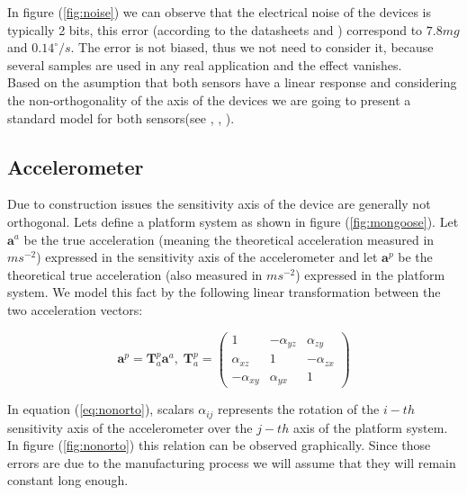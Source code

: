 \documentclass[conference]{IEEEtran}
\newcommand{\refp}[1]{(\ref{#1})}
\begin{document}
In figure \refp{fig:noise} we can observe that the electrical noise of the devices is typically 2 bits, this error (according to the datasheets \cite{bib:acc_data} and \cite{bib:gyro_data}) correspond to $7.8 mg$ and $0.14 ^{\circ}/s $. The error is not biased, thus we not need to consider it, because several samples are used in any real application and the effect vanishes.\\

Based on the asumption that both sensors have a linear response and considering the non-orthogonality of the axis of the devices we are going to present a standard model for both sensors(see \cite{bib:calib_imu}, \cite{bib:kalman}, \cite{bib:calib_imu_dos}).

\subsection{Accelerometer}
Due to construction issues the sensitivity axis of the device are generally not orthogonal. Lets define a platform system as shown in figure \refp{fig:mongoose}. Let $\mathbf{a}^a$ be the true acceleration (meaning the theoretical acceleration measured in $ms^{-2}$) expressed in the sensitivity axis of the accelerometer and let $\mathbf{a}^p$ be the theoretical true acceleration (also measured in $ms^{-2}$) expressed in the platform system. We model this fact by the following linear transformation between the two acceleration vectors:

\begin{equation}
\mathbf{a}^p = \mathbf{T}_a^p\mathbf{a}^a, \; \mathbf{T}_a^p = \left(\begin{array}{ccc}
1 & - \alpha_{yz} & \alpha_{zy}\\
\alpha_{xz} & 1 & - \alpha_{zx}\\
-\alpha_{xy} & \alpha_{yx} & 1
\end{array}\right)
\label{eq:nonorto}
\end{equation}

In equation \refp{eq:nonorto}, scalars $\alpha_{ij}$ represents the rotation of the $i-th$ sensitivity axis of the accelerometer over the $j-th$ axis of the platform system. In figure \refp{fig:nonorto} this relation can be observed graphically. Since those errors are due to the manufacturing process we will assume that they will remain constant long enough.
\end{document}
